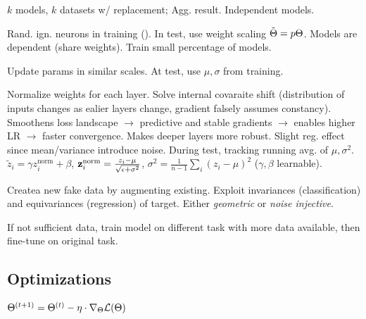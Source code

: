 \begin{definition}
    \(k\) models, \(k\) datasets w/ replacement; Agg. result. Independent models.
\end{definition}

\begin{definition}[Dropout]
    Rand. ign. neurons in training (). In test, use weight scaling \(\tilde{\Theta} = p\Theta\). Models are dependent (share weights). Train small percentage of models.
\end{definition}

\begin{definition}
    Update params in similar scales. At test, use \(\mu, \sigma\) from training.
\end{definition}

\begin{definition}
    Normalize weights for each layer. Solve internal covaraite shift (distribution of inputs changes as ealier layers change, gradient falsely assumes constancy). Smoothens loss landscape \(\to\) predictive and stable gradients \(\to\) enables higher LR \(\to\) faster convergence.
    Makes deeper layers more robust. Slight reg. effect since mean/variance introduce noise. During test, tracking running avg. of \(\mu, \sigma^2\).
    \(\tilde z_i = \gamma z_i^{\text{norm}} + \beta\), \(\vb{z}_i^{\text{norm}} = \frac{z_i - \mu}{\sqrt{\epsilon + \sigma^2}}\), \(\sigma^2 = \frac{1}{n-1}\sum_i(z_i - \mu)^2\) (\(\gamma, \beta\) learnable).
\end{definition}

\begin{definition}
    Createa new fake data by augmenting existing. Exploit invariances (classification) and equivariances (regression) of target. Either \textit{geometric} or \textit{noise injective}.
\end{definition}

\begin{definition}
    If not sufficient data, train model on different task with more data available, then fine-tune on original task.
\end{definition}

\subsection{Optimizations}
\begin{definition}[GD]
    \(\Theta^{(t+1)} = \Theta^{(t)} - \eta \cdot \nabla_\Theta \mathcal{L}(\Theta)\)
\end{definition}

